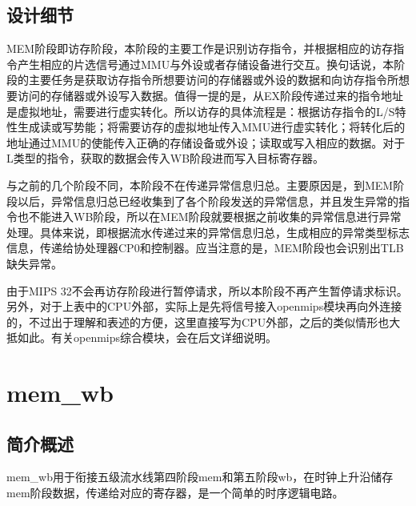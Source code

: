     \subsection{设计细节}
    MEM阶段即访存阶段，本阶段的主要工作是识别访存指令，并根据相应的访存指令产生相应的片选信号通过MMU与外设或者存储设备进行交互。换句话说，本阶段的主要任务是获取访存指令所想要访问的存储器或外设的数据和向访存指令所想要访问的存储器或外设写入数据。值得一提的是，从EX阶段传递过来的指令地址是虚拟地址，需要进行虚实转化。所以访存的具体流程是：根据访存指令的L/S特性生成读或写势能；将需要访存的虚拟地址传入MMU进行虚实转化；将转化后的地址通过MMU的使能传入正确的存储设备或外设；读取或写入相应的数据。对于L类型的指令，获取的数据会传入WB阶段进而写入目标寄存器。

    与之前的几个阶段不同，本阶段不在传递异常信息归总。主要原因是，到MEM阶段以后，异常信息归总已经收集到了各个阶段发送的异常信息，并且发生异常的指令也不能进入WB阶段，所以在MEM阶段就要根据之前收集的异常信息进行异常处理。具体来说，即根据流水传递过来的异常信息归总，生成相应的异常类型标志信息，传递给协处理器CP0和控制器。应当注意的是，MEM阶段也会识别出TLB缺失异常。

    由于MIPS 32不会再访存阶段进行暂停请求，所以本阶段不再产生暂停请求标识。另外，对于上表中的CPU外部，实际上是先将信号接入openmips模块再向外连接的，不过出于理解和表述的方便，这里直接写为CPU外部，之后的类似情形也大抵如此。有关openmips综合模块，会在后文详细说明。
    
\section{mem\_wb}

    \subsection{简介概述}
    mem\_wb用于衔接五级流水线第四阶段mem和第五阶段wb，在时钟上升沿储存mem阶段数据，传递给对应的寄存器，是一个简单的时序逻辑电路。

